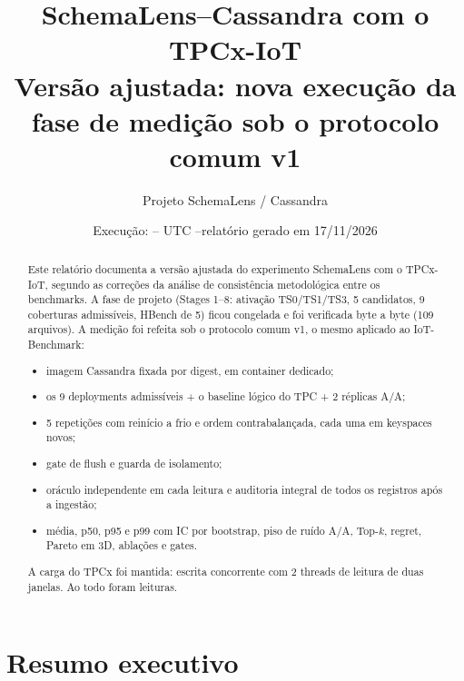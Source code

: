\documentclass[11pt,a4paper]{article}
\title{\textbf{SchemaLens--Cassandra com o TPCx-IoT}\\[4pt]
\large Versão ajustada: nova execução da fase de medição sob o protocolo comum v1}
\author{Projeto SchemaLens / Cassandra}
\date{Execução: \envstarted--\envfinished{} UTC \quad--\quad relatório gerado em 17/11/2026}
\begin{document}
\maketitle

\begin{abstract}
\noindent Este relatório documenta a versão ajustada do experimento SchemaLens com o TPCx-IoT, segundo as correções da análise de consistência metodológica entre os benchmarks. A fase de projeto (Stages 1--8: ativação TS0/TS1/TS3, 5 candidatos, 9 coberturas admissíveis, HBench de 5) ficou congelada e foi verificada byte a byte (109 arquivos). A medição foi refeita sob o protocolo comum v1, o mesmo aplicado ao IoT-Benchmark:
\begin{itemize}
\item imagem Cassandra \envversion{} fixada por digest, em container dedicado;
\item os 9 deployments admissíveis + o baseline lógico do TPC + 2 réplicas A/A;
\item 5 repetições com reinício a frio e ordem contrabalançada, cada uma em keyspaces novos;
\item gate de flush e guarda de isolamento;
\item oráculo independente em cada leitura e auditoria integral de todos os registros após a ingestão;
\item média, p50, p95 e p99 com IC por bootstrap, piso de ruído A/A, Top-$k$, regret, Pareto em 3D, ablações e gates.
\end{itemize}
A carga do TPCx foi mantida: escrita concorrente com 2 threads de leitura de duas janelas. Ao todo foram \envrawreads{} leituras. 
\end{abstract}

\tableofcontents
\newpage

\section{Resumo executivo}

\end{document}
